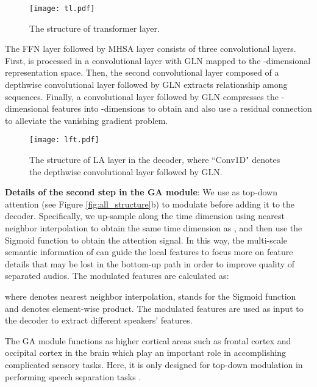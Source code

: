 \documentclass{article} \usepackage{iclr2023_conference,times}
\begin{document}
\begin{wrapfigure}{tr}{0.55\textwidth}
  \vspace{-10pt}
\centering
\texttt{[image: tl.pdf]}
\caption{The structure of transformer layer.}
\label{fig:tl}
\end{wrapfigure}


The FFN layer followed by MHSA layer consists of three convolutional layers. First,  is processed in a  convolutional layer with GLN mapped to the -dimensional representation space. Then, the second convolutional layer composed of a  depthwise convolutional layer followed by GLN extracts relationship among  sequences. Finally, a  convolutional layer followed by GLN compresses the -dimensional features into -dimensions to obtain  and also use a residual connection to alleviate the vanishing gradient problem.

\begin{wrapfigure}{tr}{0.55\textwidth}
  \vspace{-10pt}
\centering
\texttt{[image: lft.pdf]}
\caption{The structure of LA layer in the decoder, where ``Conv1D" denotes the  depthwise convolutional layer followed by GLN.}
\label{fig:lft}
\end{wrapfigure}



\textbf{Details of the second step in the GA module}: We use  as top-down attention (see Figure \ref{fig:all_structure}b) to modulate  before adding it to the decoder. Specifically, we up-sample  along the time dimension using nearest neighbor interpolation to obtain the same time dimension as , and then use the Sigmoid function to obtain the attention signal. In this way, the multi-scale semantic information of  can guide the local features  to focus more on feature details that may be lost in the bottom-up path in order to improve quality of separated audios. The modulated features are calculated as:

where  denotes nearest neighbor interpolation,  stands for the Sigmoid function and  denotes element-wise product. The modulated features  are used as input to the decoder to extract different speakers' features.

The GA module functions as higher cortical areas such as frontal cortex and occipital cortex in the brain which play an important role in accomplishing complicated sensory tasks. Here, it is only designed for top-down modulation in performing speech separation tasks \citep{bareham2018role, cohen2005auditory}. 
\end{document}

